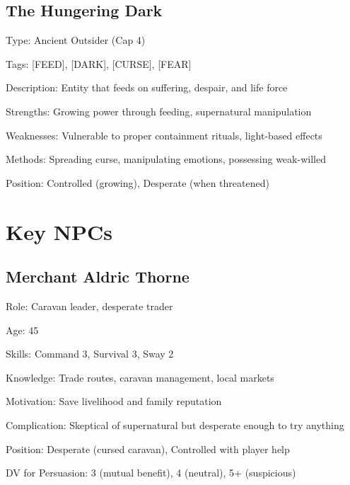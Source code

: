 \documentclass[11pt]{article}
\newenvironment{npc}[1]{\begin{description}[leftmargin=*,style=standard]\item[\textbf{#1}]}{\end{description}}
\newenvironment{faction}[1]{\begin{description}[leftmargin=*,style=standard]\item[\textbf{#1}]}{\end{description}}
\begin{document}
\subsection{The Hungering Dark}
\begin{faction}{The Hungering Dark}
\item[Type:] Ancient Outsider (Cap 4)
\item[Tags:] [FEED], [DARK], [CURSE], [FEAR]
\item[Description:] Entity that feeds on suffering, despair, and life force
\item[Strengths:] Growing power through feeding, supernatural manipulation
\item[Weaknesses:] Vulnerable to proper containment rituals, light-based effects
\item[Methods:] Spreading curse, manipulating emotions, possessing weak-willed
\item[Position:] Controlled (growing), Desperate (when threatened)
\end{faction}

\section{Key NPCs}

\subsection{Merchant Aldric Thorne}
\begin{npc}{Merchant Aldric Thorne}
\item[Role:] Caravan leader, desperate trader
\item[Age:] 45
\item[Skills:] Command 3, Survival 3, Sway 2
\item[Knowledge:] Trade routes, caravan management, local markets
\item[Motivation:] Save livelihood and family reputation
\item[Complication:] Skeptical of supernatural but desperate enough to try anything
\item[Position:] Desperate (cursed caravan), Controlled with player help
\item[DV for Persuasion:] 3 (mutual benefit), 4 (neutral), 5+ (suspicious)
\end{npc}
\end{document}
